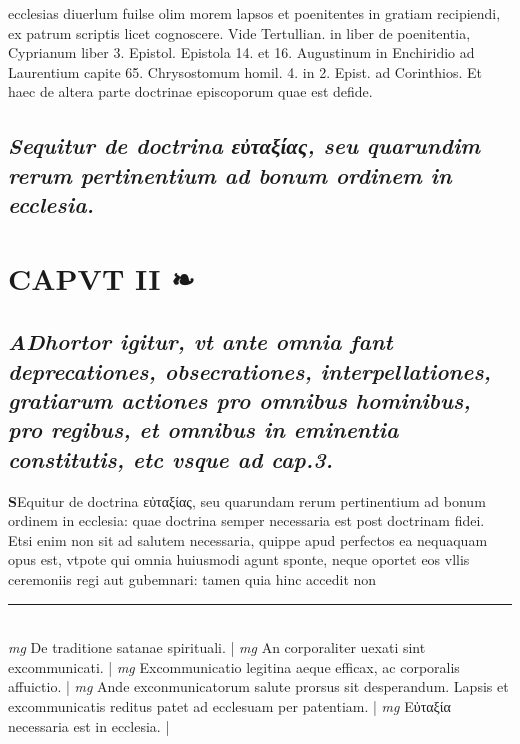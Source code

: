 \documentclass{article}
\begin{document}
\begin{pages}
ecclesias diuerlum fuilse olim morem lapsos et poenitentes in gratiam recipiendi, ex patrum scriptis licet cognoscere. Vide Tertullian. in liber  de poenitentia, Cyprianum liber  3. Epistol. Epistola 14. et 16. Augustinum in Enchiridio ad Laurentium capite 65. Chrysostomum homil. 4. in 2. Epist. ad Corinthios. Et haec de altera parte doctrinae episcoporum quae est defide.  \pend
{}
{}
\subsection*{\textit{Sequitur de doctrina εὐταξίας, seu quarundim rerum pertinentium ad bonum ordinem in ecclesia. }}
\section{CAPVT II ❧}
{}
\subsection*{\textit{\huge\textbf{A}\normalsize Dhortor igitur, vt ante omnia fant deprecationes, obsecrationes, interpellationes, gratiarum actiones pro omnibus hominibus, pro regibus, et omnibus in eminentia constitutis, etc vsque  ad cap.3. }}\pstart \huge\textbf{S}\normalsize Equitur de doctrina εὐταξίας, seu quarundam rerum pertinentium ad bonum ordinem in ecclesia: quae doctrina semper necessaria est post doctrinam fidei. Etsi enim non sit ad salutem necessaria, quippe apud perfectos ea nequaquam opus est, vtpote qui omnia huiusmodi agunt sponte, neque oportet eos vllis ceremoniis regi aut gubemnari: tamen quia hinc accedit non\pend
\vspace{0.5cm}\noindent
\vspace{0.2cm}\rule{1cm}{0.2pt}\\ 
\hspace{0.2cm}\textit{mg}
\footnotesize De traditione satanae spirituali. 
\normalsize| 
\hspace{0.2cm}\textit{mg}
\footnotesize An corporaliter uexati sint excommunicati. 
\normalsize| 
\hspace{0.2cm}\textit{mg}
\footnotesize Excommunicatio legitina aeque  efficax, ac corporalis affuictio. 
\normalsize| 
\hspace{0.2cm}\textit{mg}
\footnotesize Ande exconmunicatorum salute prorsus sit desperandum. Lapsis et excommunicatis reditus patet ad ecclesuam per patentiam. 
\normalsize| 
\hspace{0.2cm}\textit{mg}
\footnotesize Εὐταξία necessaria est in ecclesia. 
\normalsize| 

\end{pages}
\end{document}
